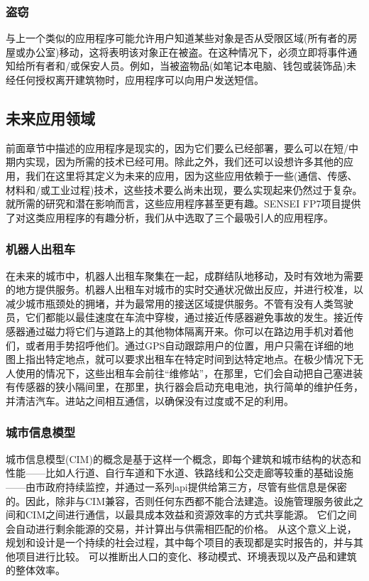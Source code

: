 \documentclass[12pt,a4paper]{article}%
\begin{document}
\subsubsection{盗窃}
与上一个类似的应用程序可能允许用户知道某些对象是否从受限区域(所有者的房屋或办公室)移动，这将表明该对象正在被盗。在这种情况下，必须立即将事件通知给所有者和/或保安人员。例如，当被盗物品(如笔记本电脑、钱包或装饰品)未经任何授权离开建筑物时，应用程序可以向用户发送短信。
\subsection{未来应用领域}
前面章节中描述的应用程序是现实的，因为它们要么已经部署，要么可以在短/中期内实现，因为所需的技术已经可用。除此之外，我们还可以设想许多其他的应用，我们在这里将其定义为未来的应用，因为这些应用依赖于一些(通信、传感、材料和/或工业过程)技术，这些技术要么尚未出现，要么实现起来仍然过于复杂。就所需的研究和潜在影响而言，这些应用程序甚至更有趣。SENSEI FP7项目提供了对这类应用程序的有趣分析，我们从中选取了三个最吸引人的应用程序。
\subsubsection{机器人出租车}
在未来的城市中，机器人出租车聚集在一起，成群结队地移动，及时有效地为需要的地方提供服务。机器人出租车对城市的实时交通状况做出反应，并进行校准，以减少城市瓶颈处的拥堵，并为最常用的接送区域提供服务。不管有没有人类驾驶员，它们都能以最佳速度在车流中穿梭，通过接近传感器避免事故的发生。接近传感器通过磁力将它们与道路上的其他物体隔离开来。你可以在路边用手机对着他们，或者用手势招呼他们。通过GPS自动跟踪用户的位置，用户只需在详细的地图上指出特定地点，就可以要求出租车在特定时间到达特定地点。在极少情况下无人使用的情况下，这些出租车会前往“维修站”，在那里，它们会自动把自己塞进装有传感器的狭小隔间里，在那里，执行器会启动充电电池，执行简单的维护任务，并清洁汽车。进站之间相互通信，以确保没有过度或不足的利用。
\subsubsection{城市信息模型}
城市信息模型(CIM)的概念是基于这样一个概念，即每个建筑和城市结构的状态和性能——比如人行道、自行车道和下水道、铁路线和公交走廊等较重的基础设施——由市政府持续监控，并通过一系列api提供给第三方，尽管有些信息是保密的。因此，除非与CIM兼容，否则任何东西都不能合法建造。设施管理服务彼此之间和CIM之间进行通信，以最具成本效益和资源效率的方式共享能源。
它们之间会自动进行剩余能源的交易，并计算出与供需相匹配的价格。
从这个意义上说，规划和设计是一个持续的社会过程，其中每个项目的表现都是实时报告的，并与其他项目进行比较。
可以推断出人口的变化、移动模式、环境表现以及产品和建筑的整体效率。
\end{document}
